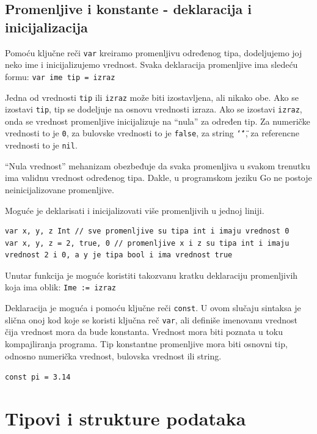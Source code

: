 \documentclass[a4paper]{article}
\begin{document}
\subsection{Promenljive i konstante - deklaracija i inicijalizacija}
\label{subsec:prom_i_konst}

Pomoću ključne reči \texttt{var} kreiramo promenljivu određenog tipa, dodeljujemo joj neko ime i inicijalizujemo vrednost. Svaka deklaracija promenljive ima sledeću formu: \lstinline{var ime tip = izraz}

Jedna od vrednosti \texttt{tip} ili \texttt{izraz} može biti izostavljena, ali nikako obe. Ako se izostavi \texttt{tip}, tip se dodeljuje na osnovu vrednosti izraza. Ako se izostavi \texttt{izraz}, onda se vrednost promenljive inicijalizuje na “nula” za određen tip. Za numeričke vrednosti to je \texttt{0}, za bulovske vrednosti to je \texttt{false}, za string \texttt{\char`\"\char`\"}, za referencne vrednosti to je \texttt{nil}.

“Nula vrednost” mehanizam obezbeđuje da svaka promenljiva u svakom trenutku ima validnu vrednost određenog tipa. Dakle, u programskom jeziku Go ne postoje neinicijalizovane promenljive.

Moguće je deklarisati i inicijalizovati više promenljivih u jednoj liniji. 
\begin{lstlisting}[caption={Inicijalizacija i deklaracija više promenljivih},frame=single, label=Inicijalizacija_i_deklaracija_vise_promenljivih]
var x, y, z Int // sve promenljive su tipa int i imaju vrednost 0
var x, y, z = 2, true, 0 // promenljive x i z su tipa int i imaju vrednost 2 i 0, a y je tipa bool i ima vrednost true
\end{lstlisting}


Unutar funkcija je moguće koristiti takozvanu kratku deklaraciju promenljivih koja ima oblik:
\lstinline{Ime := izraz}

Deklaracija je moguća i pomoću ključne reči \texttt{const}. U ovom slučaju sintaksa je slična onoj kod koje se koristi ključna reč \texttt{var}, ali definiše imenovanu vrednost čija vrednost mora da bude konstanta. Vrednost mora biti poznata u toku kompajliranja programa. Tip konstantne promenljive mora biti osnovni tip, odnosno numerička vrednost, bulovska vrednost ili string.

\lstinline{const pi = 3.14}

\section{Tipovi i strukture podataka}	
\label{sec:tipovi_i_strukture}
\end{document}
